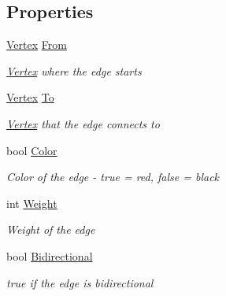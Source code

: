 \subsection*{Properties}
\begin{DoxyCompactItemize}
\item 
\hyperlink{class_graph_1_1_vertex}{Vertex} \hyperlink{class_graph_1_1_edge_aa8c3fe4814c4db91276161e22eb8a930}{From}
\begin{DoxyCompactList}\small\item\em \hyperlink{class_graph_1_1_vertex}{Vertex} where the edge starts \end{DoxyCompactList}\item 
\hyperlink{class_graph_1_1_vertex}{Vertex} \hyperlink{class_graph_1_1_edge_a55661e4bd903eb6d33e48129124360e8}{To}
\begin{DoxyCompactList}\small\item\em \hyperlink{class_graph_1_1_vertex}{Vertex} that the edge connects to \end{DoxyCompactList}\item 
bool \hyperlink{class_graph_1_1_edge_a01a68bb38bf2ea3498d9ff9be3b74338}{Color}
\begin{DoxyCompactList}\small\item\em Color of the edge -\/ true = red, false = black \end{DoxyCompactList}\item 
int \hyperlink{class_graph_1_1_edge_a34f6965d86e366584d5679bba8fe54ad}{Weight}
\begin{DoxyCompactList}\small\item\em Weight of the edge \end{DoxyCompactList}\item 
bool \hyperlink{class_graph_1_1_edge_a26fcbf19716fd9202a8e995b305fad17}{Bidirectional}
\begin{DoxyCompactList}\small\item\em true if the edge is bidirectional \end{DoxyCompactList}\end{DoxyCompactItemize}


